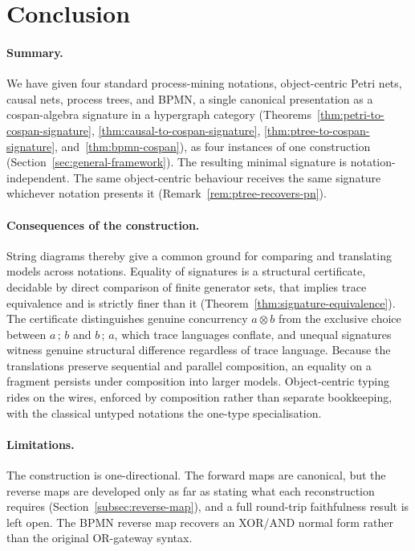 \section{Conclusion}\label{sec:conclusion}

\paragraph{Summary.}
We have given four standard process-mining notations, object-centric Petri nets, causal nets,
process trees, and BPMN, a single canonical presentation as a cospan-algebra signature in a
hypergraph category (Theorems~\ref{thm:petri-to-cospan-signature},
\ref{thm:causal-to-cospan-signature}, \ref{thm:ptree-to-cospan-signature},
and~\ref{thm:bpmn-cospan}), as four instances of one construction
(Section~\ref{sec:general-framework}). The resulting minimal signature is notation-independent. The
same object-centric behaviour receives the same signature whichever notation presents it
(Remark~\ref{rem:ptree-recovers-pn}).

\paragraph{Consequences of the construction.}
String diagrams thereby give a common ground for comparing and translating models across notations.
Equality of signatures is a structural certificate, decidable by direct comparison of finite
generator sets, that implies trace equivalence and is strictly finer than it
(Theorem~\ref{thm:signature-equivalence}). The certificate distinguishes genuine concurrency $a\otimes b$ from
the exclusive choice between $a\,;\,b$ and $b\,;\,a$, which trace languages conflate, and unequal
signatures witness genuine structural difference regardless of trace language. Because the
translations preserve sequential and parallel composition, an equality on a fragment persists under
composition into larger models. Object-centric typing rides on the wires, enforced by composition
rather than separate bookkeeping, with the classical untyped notations the one-type specialisation.

\paragraph{Limitations.}
The construction is one-directional. The forward maps are canonical, but the reverse maps are
developed only as far as stating what each reconstruction requires
(Section~\ref{subsec:reverse-map}), and a full round-trip faithfulness result is left open. The BPMN reverse map recovers an XOR/AND normal form rather than
the original OR-gateway syntax.

